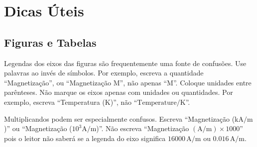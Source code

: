 
\section{Dicas Úteis}

\subsection{Figuras e Tabelas}

Legendas dos eixos das figuras são frequentemente uma fonte de confusões. Use
palavras ao invés de símbolos. Por exemplo, escreva a quantidade ``Magnetização'',
ou ``Magnetização M'', não apenas ``M''. Coloque unidades entre parênteses. Não marque
os eixos apenas com unidades ou quantidades. Por exemplo, escreva 
``Temperatura ($\mathrm{K}$)'', não ``$\mbox{Temperature}/\mathrm{K}$''.

Multiplicandos podem ser especialmente confusos. Escreva  ``Magnetização 
($\mathrm{kA}/\mathrm{m}$)'' ou ``Magnetização ($10^3 \mathrm{A}/\mathrm{m}$)''. 
Não escreva 
``Magnetização $(\mathrm{A}/\mathrm{m}) \times 1000$'' pois o leitor não saberá
se a legenda do eixo significa 
$16000\,\mathrm{A}/\mathrm{m}$ ou $0.016\,\mathrm{A}/\mathrm{m}$.

%

